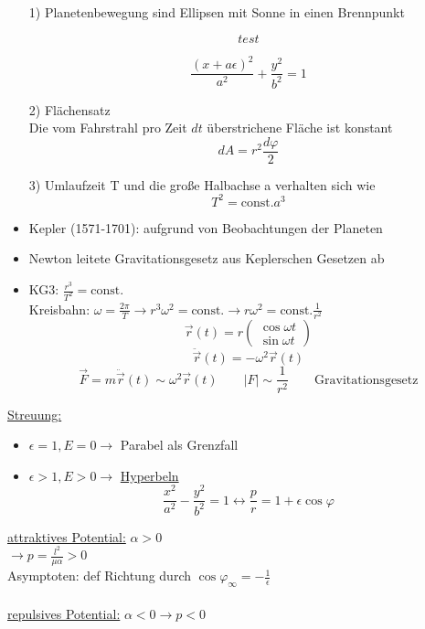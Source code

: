 \documentclass[titlepage,12pt,a4paper,ngerman]{report}
\newcommand{\tx}[1]{\textrm{#1}}
\begin{document}
{\begin{itemize}
	\item[1)] Planetenbewegung sind Ellipsen mit Sonne in einen Brennpunkt\\
	\begin{minipage}{.5\linewidth}
		$$ test $$
	\end{minipage}
	\begin{minipage}{.5\linewidth}
		$$\frac{(x+a\epsilon)^2}{a^2} + \frac{y^2}{b^2} = 1$$
	\end{minipage}
	\item[2)] Flächensatz\\
	Die vom Fahrstrahl pro Zeit $ dt $ überstrichene Fläche ist konstant
	$$ dA = r^2 \frac{d\varphi}{2} $$
	\item[3)] Umlaufzeit  T und die große Halbachse a verhalten sich wie
	$$ T^2 = \tx{const.} a^3$$
\end{itemize}
\begin{itemize}
	\item Kepler (1571-1701): aufgrund von Beobachtungen der Planeten
	\item Newton leitete Gravitationsgesetz aus Keplerschen Gesetzen ab
	\item  KG3: $ \frac{r^3}{T^2} = \tx{const.} $\\
	Kreisbahn: $ \omega = \frac{2\pi}{T}  \rightarrow r^3 \omega^2 = \tx{const.} \rightarrow r \omega^2 = \tx{const.} \frac{1}{r^2}$
	$$\vec{r}(t) = r \begin{pmatrix}
	\cos \omega t \\
	\sin \omega t
	\end{pmatrix}$$
	$$\ddot{\vec{r}} (t) = - \omega^2 \vec{r}(t)$$
	$$\vec{F} = m \ddot{\vec{r}} (t) \sim \omega^2 \vec{r}(t) \qquad |F| \sim \frac{1}{r^2} \qquad \tx{Gravitationsgesetz}$$
\end{itemize}

\underline{Streuung:}
\begin{itemize}
	\item $ \epsilon = 1, E = 0 \rightarrow $ Parabel als Grenzfall
	\item $ \epsilon > 1, E > 0 \rightarrow $ \underline{Hyperbeln}
	$$\frac{x^2}{a^2} - \frac{y^2}{b^2} = 1 \leftrightarrow \frac{p}{r} = 1 + \epsilon \cos \varphi$$
\end{itemize}
\underline{attraktives Potential:} $ \alpha > 0 $\\
$ \rightarrow p = \frac{l^2}{\mu \alpha} > 0 $\\
Asymptoten: def Richtung durch $ \cos \varphi_\infty = -\frac{1}{\epsilon} $\\\\
\underline{repulsives Potential:} $ \alpha < 0 \rightarrow p < 0 $\\

}
\end{document}
